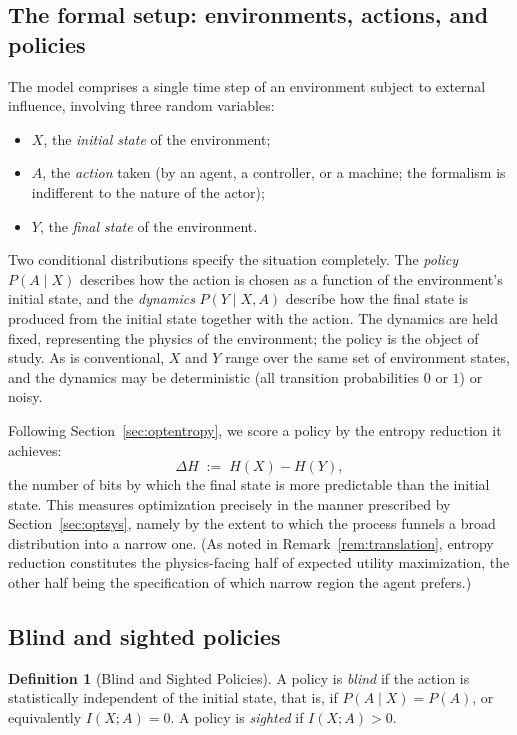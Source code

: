 \documentclass[10pt]{article}
\theoremstyle{definition}
\newtheorem{definition}[theorem]{Definition}
\theoremstyle{remark}
\begin{document}
\subsection{The formal setup: environments, actions, and policies}
\label{sec:tlsetup}

The model comprises a single time step of an environment subject to external influence, involving three random variables:

\begin{itemize}[leftmargin=2em]
  \item $X$, the \emph{initial state} of the environment;
  \item $A$, the \emph{action} taken (by an agent, a controller, or a machine; the formalism is indifferent to the nature of the actor);
  \item $Y$, the \emph{final state} of the environment.
\end{itemize}

Two conditional distributions specify the situation completely. The \emph{policy} $P(A \mid X)$ describes how the action is chosen as a function of the environment's initial state, and the \emph{dynamics} $P(Y \mid X, A)$ describe how the final state is produced from the initial state together with the action. The dynamics are held fixed, representing the physics of the environment; the policy is the object of study. As is conventional, $X$ and $Y$ range over the same set of environment states, and the dynamics may be deterministic (all transition probabilities $0$ or $1$) or noisy.

Following Section~\ref{sec:optentropy}, we score a policy by the entropy reduction it achieves:
\[
\Delta H \;:=\; H(X) - H(Y),
\]
the number of bits by which the final state is more predictable than the initial state. This measures optimization precisely in the manner prescribed by Section~\ref{sec:optsys}, namely by the extent to which the process funnels a broad distribution into a narrow one. (As noted in Remark~\ref{rem:translation}, entropy reduction constitutes the physics-facing half of expected utility maximization, the other half being the specification of which narrow region the agent prefers.)

\subsection{Blind and sighted policies}
\label{sec:blindsighted}

\begin{definition}[Blind and Sighted Policies]
\label{def:blind}
A policy is \emph{blind} if the action is statistically independent of the initial state, that is, if $P(A \mid X) = P(A)$, or equivalently $I(X; A) = 0$. A policy is \emph{sighted} if $I(X; A) > 0$.
\end{definition}
\end{document}
